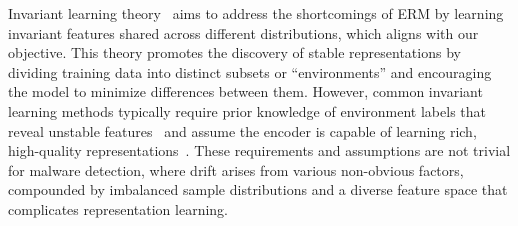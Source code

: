 
Invariant learning theory~\cite{IR_intro} aims to address the shortcomings of ERM by learning invariant features shared across different distributions, which aligns with our objective. This theory promotes the discovery of stable representations by dividing training data into distinct subsets or ``environments'' and encouraging the model to minimize differences between them. However, common invariant learning methods typically require prior knowledge of environment labels that reveal unstable features~\cite{environment_label, env_label} and assume the encoder is capable of learning rich, high-quality representations~\cite{yang2024invariant}. These requirements and assumptions are not trivial for malware detection, where drift arises from various non-obvious factors, compounded by imbalanced sample distributions and a diverse feature space that complicates representation learning.

